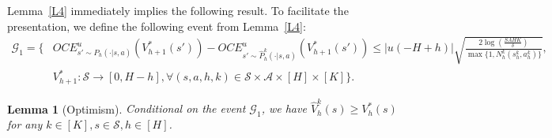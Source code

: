 \documentclass[11pt]{article}
\newtheorem{lemma}{Lemma}
\newcommand{\1}{\mathbbm{1}}
\begin{document}
Lemma~\ref{L4} immediately implies the following result. To facilitate the presentation, we define the following event from Lemma~\ref{L4}:
\begin{align}\label{G1}
\mathcal{G}_1=\Bigg\{& OCE^{u}_{s'\sim P_h(\cdot\vert s,a)}(V_{h+1}^*(s'))-OCE^{u}_{s'\sim \hat{P}^k_h(\cdot\vert s,a)}(V_{h+1}^*(s')) \leq \vert u(-H+h)\vert\sqrt{\frac{2\log\left (\frac{SAHK}{\delta}\right )}{\max\{1,N_h^k(s_h^k,a_h^k)\}}},\nonumber\\
&V_{h+1}^*:\mathcal{S}\to [0,H-h],\forall (s,a,h,k)\in \mathcal{S}\times \mathcal{A}\times [H]\times [K]\Bigg\}.
\end{align}

\begin{lemma}[Optimism]\label{L5}
Conditional on the event $\mathcal{G}_1$, we have
$\hat{V}_h^k(s)\geq V^*_h(s)$ for any $k\in [K],s\in \mathcal{S}, h\in [H]$.

\end{lemma}
\end{document}

